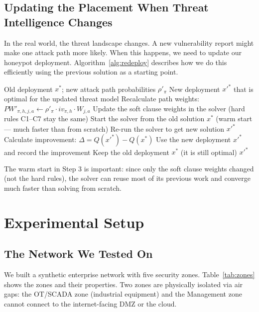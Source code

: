 \documentclass[journal]{IEEEtran}
\begin{document}
\subsection{Updating the Placement When Threat Intelligence Changes}
\label{sec:redeployment}

In the real world, the threat landscape changes. A new vulnerability
report might make one attack path more likely. When this happens,
we need to update our honeypot deployment. Algorithm~\ref{alg:redeploy}
describes how we do this efficiently using the previous solution as
a starting point.

\begin{algorithm}[htbp]
\caption{Adaptive Redeployment When Threat Priors Change}
\label{alg:redeploy}
\begin{algorithmic}[1]
\REQUIRE Old deployment $x^*$; new attack path probabilities $\rho'_\pi$
\ENSURE  New deployment $x'^*$ that is optimal for the updated threat model
\STATE Recalculate path weights: $PW'_{\pi,h,j,a} \leftarrow \rho'_\pi \cdot iv_{\pi,h} \cdot W_{j,a}$
\STATE Update the soft clause weights in the solver (hard rules C1--C7 stay the same)
\STATE Start the solver from the old solution $x^*$ (warm start --- much faster than from scratch)
\STATE Re-run the solver to get new solution $x'^*$
\STATE Calculate improvement: $\Delta = Q(x'^*) - Q(x^*)$
  \STATE Use the new deployment $x'^*$ and record the improvement
\ELSE
  \STATE Keep the old deployment $x^*$ (it is still optimal)
\ENDIF
\RETURN $x'^*$
\end{algorithmic}
\end{algorithm}

The warm start in Step 3 is important: since only the soft clause
weights changed (not the hard rules), the solver can reuse most of
its previous work and converge much faster than solving from scratch.

\section{Experimental Setup}
\label{sec:methodology}

\subsection{The Network We Tested On}

We built a synthetic enterprise network with five security zones.
Table~\ref{tab:zones} shows the zones and their properties. Two
zones are physically isolated via air gaps: the OT/SCADA zone
(industrial equipment) and the Management zone cannot connect to
the internet-facing DMZ or the cloud.
\end{document}
